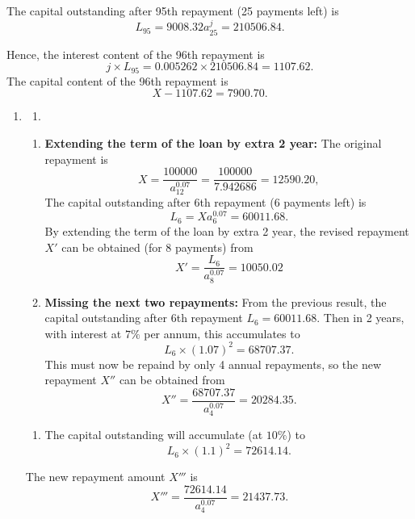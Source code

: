 \documentclass[
]{book}
\providecommand{\tightlist}{%
  \setlength{\itemsep}{0pt}\setlength{\parskip}{0pt}}
\theoremstyle{definition}
\theoremstyle{definition}
\theoremstyle{definition}
\theoremstyle{definition}
\theoremstyle{remark}
\begin{document}
The capital outstanding after 95th repayment (25 payments left) is
\[ L_{95} = 9008.32 a^j_{25} = 210506.84.  \]

Hence, the interest content of the 96th repayment is
\[ j \times L_{95} = 0.005262 \times 210506.84 = 1107.62.\]
The capital content of the 96th repayment is
\[ X - 1107.62 = 7900.70. \]

\begin{enumerate}
\def\labelenumi{\arabic{enumi}.}
\setcounter{enumi}{2}
\item
  \begin{enumerate}
  \def\labelenumii{\arabic{enumii}.}
  \tightlist
  \item
  \end{enumerate}

  \begin{enumerate}
  \def\labelenumii{\alph{enumii}.}
  \item
    \textbf{Extending the term of the loan by extra 2 year:} The original repayment is
    \[ X = \frac{100000}{a^{0.07}_{12}} = \frac{100000}{7.942686} = 12590.20,\]
    The capital outstanding after 6th repayment (6 payments left) is
    \[ L_{6} = X a^{0.07}_{6} = 60011.68.  \]
    By extending the term of the loan by extra 2 year, the revised repayment \(X'\) can be obtained (for 8 payments) from
    \[ X' = \frac{L_6}{a^{0.07}_{8}} = 10050.02\]
  \item
    \textbf{Missing the next two repayments:} From the previous result, the capital outstanding after 6th repayment \(L_6 = 60011.68\). Then in 2 years, with interest at \(7\%\) per annum, this accumulates to
    \[ L_6 \times (1.07)^2 = 68707.37. \]
    This must now be repaind by only 4 annual repayments, so the new repayment \(X''\) can be obtained from
    \[ X'' = \frac{68707.37}{a^{0.07}_{4}} = 20284.35.\]
  \end{enumerate}

  \begin{enumerate}
  \def\labelenumii{\arabic{enumii}.}
  \setcounter{enumii}{1}
  \tightlist
  \item
    The capital outstanding will accumulate (at \(10\%\)) to
    \[ L_6 \times (1.1)^2 = 72614.14. \]
  \end{enumerate}

  The new repayment amount \(X'''\) is
  \[X''' = \frac{72614.14}{a^{0.07}_{4}} = 21437.73.\]


\end{enumerate}
\end{document}
